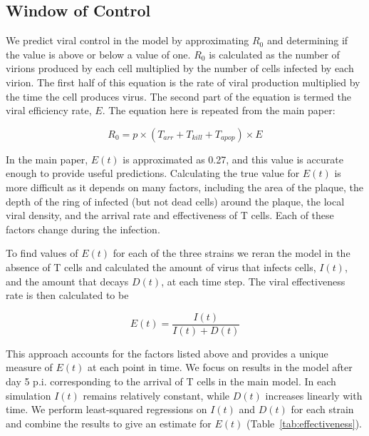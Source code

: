 \documentclass[preprint,10pt,authoryear]{elsarticle}
\begin{document}
\subsection{Window of Control}

We predict viral control in the model by approximating $R_0$ and determining if the value is above or below a value of one.  $R_0$ is calculated as the number of virions produced by each cell multiplied by the number of cells infected by each virion.  The first half of this equation is the rate of viral production multiplied by the time the cell produces virus.  The second part of the equation is termed the viral efficiency rate, $E$.  The equation here is repeated from the main paper:

\begin{equation}
R_0 = p \times (T_{arr} + T_{kill} + T_{apop}) \times E
\end{equation}

In the main paper, $E(t)$ is approximated as 0.27, and this value is accurate enough to provide useful predictions.  Calculating the true value for $E(t)$ is more difficult as it depends on many factors, including the area of the plaque, the depth of the ring of infected (but not dead cells) around the plaque, the local viral density, and the arrival rate and effectiveness of T cells.  Each of these factors change during the infection. 

To find values of $E(t)$ for each of the three strains we reran the model in the absence of T cells and calculated the amount of virus that infects cells, $I(t)$, and the amount that decays $D(t)$, at each time step.  The viral effectiveness rate is then calculated to be

\begin{equation}
E(t) = \frac{I(t)}{I(t) + D(t)}
\end{equation}

This approach accounts for the factors listed above and provides a unique measure of $E(t)$ at each point in time.  We focus on results in the model after day 5 p.i. corresponding to the arrival of T cells in the main model.  In each simulation $I(t)$ remains relatively constant, while $D(t)$ increases linearly with time.  We perform least-squared regressions on $I(t)$ and $D(t)$ for each strain and combine the results to give an estimate for $E(t)$ (Table~\ref{tab:effectiveness}).  
\end{document}
